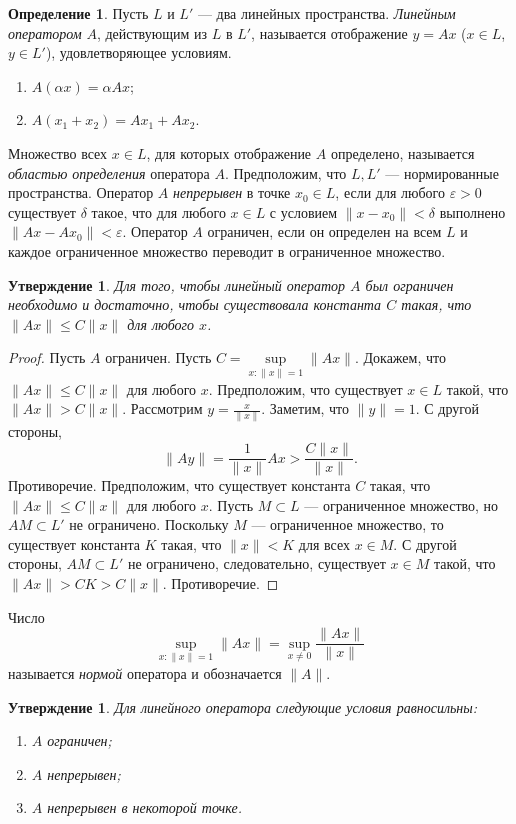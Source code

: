\documentclass[12pt, titlepage, oneside]{amsbook}
\newtheorem{claim}[theorem]{Утверждение}
\theoremstyle{definition}
\newtheorem{definition}[theorem]{Определение}
\theoremstyle{remark}
\begin{document}
\begin{definition}
	Пусть $L$ и $L'$ --- два линейных пространства. \emph{Линейным оператором} $A$, действующим из $L$ в $L'$, называется отображение $y=Ax$ ($x\in L$, $y\in L'$), удовлетворяющее условиям.
	\begin{enumerate}
		\item $A(\alpha x)=\alpha Ax$;
		\item $A(x_1+x_2)=Ax_1+Ax_2$.
	\end{enumerate}
\end{definition}

Множество всех $x\in L$, для которых отображение $A$ определено, называется \emph{областью определения} оператора $A$. Предположим, что $L,L'$ --- нормированные пространства. Оператор $A$ \emph{непрерывен} в точке $x_0\in L$, если для любого $\varepsilon>0$ существует $\delta$ такое, что для любого $x\in L$ с условием $\|x-x_0\|<\delta$ выполнено $\|Ax-Ax_0\|<\varepsilon$. Оператор $A$ ограничен, если он определен на всем $L$ и каждое ограниченное множество переводит в ограниченное множество.


\begin{claim}
	\label{Op1}
	Для того, чтобы линейный оператор $A$ был ограничен необходимо и достаточно, чтобы существовала константа $C$ такая, что $\|Ax\|\leq C\|x\|$ для любого $x$.
\end{claim}

\begin{proof}
	Пусть $A$ ограничен. Пусть $C=\sup\limits_{x:\|x\|= 1}\|Ax\|$. Докажем, что $\|Ax\|\leq C\|x\|$ для любого $x$. Предположим, что существует $x\in L$ такой, что $\|A x\|>C\|x\|$. Рассмотрим $y=\frac{x}{\|x\|}$. Заметим, что $\|y\|=1$. С другой стороны, $$\|Ay\|=\frac{1}{\|x\|}Ax>\frac{C\|x\|}{\|x\|}.$$ Противоречие. Предположим, что существует константа $C$ такая, что $\|Ax\|\leq C\|x\|$ для любого $x$. Пусть $M\subset L$ --- ограниченное множество, но $AM\subset L'$ не ограничено. Поскольку $M$ --- ограниченное множество, то существует константа $K$ такая, что $\|x\|<K$ для всех $x\in M$. С другой стороны, $AM\subset L'$ не ограничено, следовательно, существует $x\in M$ такой, что $\|Ax\|>CK>C\|x\|$. Противоречие.
\end{proof}

Число $$\sup\limits_{x:\|x\|= 1}\|Ax\|=\sup\limits_{x\neq 0}\frac{\|Ax\|}{\|x\|}$$ называется \emph{нормой} оператора и обозначается $\|A\|$.

\begin{claim}
	\label{Op2} Для линейного оператора следующие условия равносильны:
	\begin{enumerate}
		\item $A$ ограничен;
		\item $A$ непрерывен;
		\item $A$ непрерывен в некоторой точке.
	\end{enumerate}
\end{claim}
\end{document}
